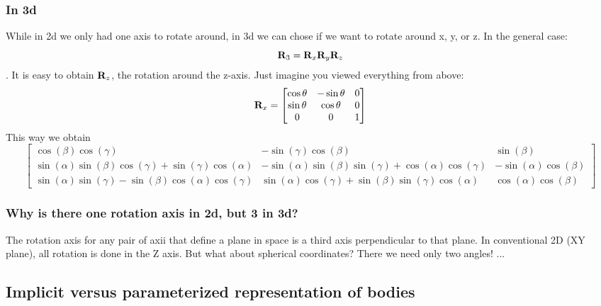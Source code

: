 \subsubsection{In 3d}
While in 2d we only had one axis to rotate around, in 3d we can chose if we want to rotate around x, y, or z. In the general case: 
$$ \mathbf{R}_3 = \mathbf{R}_x \mathbf{R}_y \mathbf{R}_z $$. 
It is easy to obtain $\mathbf{R}_z$, the rotation around the z-axis. Just imagine you viewed everything from above:
$$ \mathbf{R}_x = \begin{bmatrix}
    \cos{\theta} & -\sin{\theta} & 0 \\
    \sin{\theta} & \cos{\theta}   & 0 \\
    0            & 0             & 1
\end{bmatrix}$$
This way we obtain 
$$ 
\left[\begin{matrix}\cos{\left(\beta \right)} \cos{\left(\gamma \right)} & - \sin{\left(\gamma \right)} \cos{\left(\beta \right)} & \sin{\left(\beta \right)}\\\sin{\left(\alpha \right)} \sin{\left(\beta \right)} \cos{\left(\gamma \right)} + \sin{\left(\gamma \right)} \cos{\left(\alpha \right)} & - \sin{\left(\alpha \right)} \sin{\left(\beta \right)} \sin{\left(\gamma \right)} + \cos{\left(\alpha \right)} \cos{\left(\gamma \right)} & - \sin{\left(\alpha \right)} \cos{\left(\beta \right)}\\\sin{\left(\alpha \right)} \sin{\left(\gamma \right)} - \sin{\left(\beta \right)} \cos{\left(\alpha \right)} \cos{\left(\gamma \right)} & \sin{\left(\alpha \right)} \cos{\left(\gamma \right)} + \sin{\left(\beta \right)} \sin{\left(\gamma \right)} \cos{\left(\alpha \right)} & \cos{\left(\alpha \right)} \cos{\left(\beta \right)}\end{matrix}\right]
$$

\subsubsection{Why is there one rotation axis in 2d, but 3 in 3d?}
The rotation axis for any pair of axii that define a plane in space is a third axis perpendicular to that plane. In conventional 2D (XY plane), all rotation is done in the Z axis. 
But what about spherical coordinates? There we need only two angles! ...

\subsection{Implicit versus parameterized representation of bodies}

